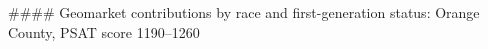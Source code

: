 #### Geomarket contributions by race and first-generation status: Orange County, PSAT score 1190–1260
